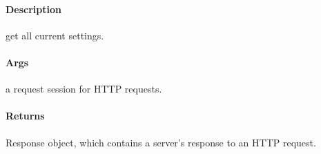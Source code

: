 \documentclass[letterpaper,10pt,english]{sphinxmanual}
\begin{document}
\begin{fulllineitems}
\label{\detokenize{gemini_perception_API:gemini_perception_API.get_perception_settings}}
\pysigstartsignatures
{}
\pysigstopsignatures

\paragraph{Description}
\label{\detokenize{gemini_perception_API:id17}}
\sphinxAtStartPar
get all current settings.


\paragraph{Args}
\label{\detokenize{gemini_perception_API:id18}}\begin{description}
\sphinxAtStartPar
a request session for HTTP requests.

\end{description}


\paragraph{Returns}
\label{\detokenize{gemini_perception_API:id19}}\begin{description}
\sphinxAtStartPar
Response object, which contains a server’s response to an HTTP request.

\end{description}

\end{fulllineitems}

\end{document}
